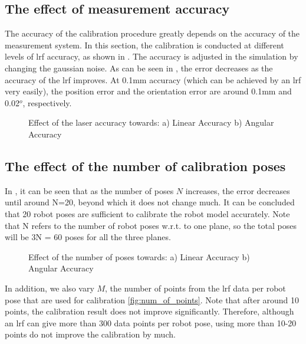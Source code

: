 \subsection{The effect of measurement accuracy}
\label{sec:meas_accuracy}
The accuracy of the calibration procedure greatly depends on the accuracy of the measurement system. In this section, the calibration is conducted at different levels of \ac{lrf} accuracy, as shown in . The accuracy is adjusted in the simulation by changing the gaussian noise. As can be seen in , the error decreases as the accuracy of the \ac{lrf} improves. At 0.1mm accuracy (which can be achieved by an \ac{lrf} very easily), the position error and the orientation error are around 0.1mm and 0.02$^o$, respectively. 
\begin{figure}[h]
  \centering
  \caption{Effect of the laser accuracy towards: a) Linear Accuracy b) Angular Accuracy} 
  \label{fig:laser_accuracy}
\end{figure}


\subsection{The effect of the number of calibration poses}
\label{sec:calib_poses}
In , it can be seen that as the number of poses $N$ increases, the error decreases until around N=20, beyond which it does not change much. It can be concluded that 20 robot poses are sufficient to calibrate the robot model accurately. Note that N refers to the number of robot poses w.r.t. to one plane, so the total poses will be 3N = 60 poses for all the three planes. 

\begin{figure}[h]
  \centering
  \caption{Effect of the number of poses towards: a) Linear Accuracy b) Angular Accuracy} 
  \label{fig:num_of_poses}
\end{figure}

In addition, we also vary $M$, the number of points from the \ac{lrf} data per robot pose that are used for calibration \ref{fig:num_of_points}. Note that after around 10 points, the calibration result does not improve significantly. Therefore, although an \ac{lrf} can give more than 300 data points per robot pose, using more than 10-20 points do not improve the calibration by much. 


